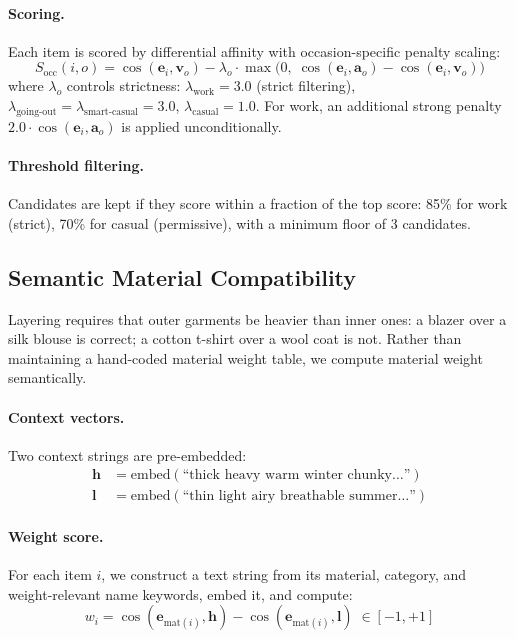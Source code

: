 \documentclass[10pt,twocolumn]{article}
\begin{document}
\paragraph{Scoring.}
Each item is scored by differential affinity with occasion-specific penalty
scaling:
\begin{equation}
  S_{\text{occ}}(i, o) = \cos(\mathbf{e}_i, \mathbf{v}_o) -
    \lambda_o \cdot \max\!\big(0,\;
    \cos(\mathbf{e}_i, \mathbf{a}_o) - \cos(\mathbf{e}_i, \mathbf{v}_o)\big)
\label{eq:occasion}
\end{equation}
where $\lambda_o$ controls strictness: $\lambda_{\text{work}} = 3.0$ (strict
filtering), $\lambda_{\text{going-out}} = \lambda_{\text{smart-casual}} =
3.0$, $\lambda_{\text{casual}} = 1.0$.  For work, an additional strong
penalty $2.0 \cdot \cos(\mathbf{e}_i, \mathbf{a}_o)$ is applied
unconditionally.

\paragraph{Threshold filtering.}
Candidates are kept if they score within a fraction of the top score:
85\% for work (strict), 70\% for casual (permissive), with a minimum floor
of 3 candidates.

\subsection{Semantic Material Compatibility}
\label{sec:material}

Layering requires that outer garments be heavier than inner ones: a blazer
over a silk blouse is correct; a cotton t-shirt over a wool coat is not.
Rather than maintaining a hand-coded material weight table, we compute
material weight semantically.

\paragraph{Context vectors.}
Two context strings are pre-embedded:
\begin{align}
  \mathbf{h} &= \text{embed}(\text{``thick heavy warm winter chunky\ldots''}) \\
  \mathbf{l} &= \text{embed}(\text{``thin light airy breathable summer\ldots''})
\end{align}

\paragraph{Weight score.}
For each item $i$, we construct a text string from its material, category,
and weight-relevant name keywords, embed it, and compute:
\begin{equation}
  w_i = \cos(\mathbf{e}_{\text{mat}(i)}, \mathbf{h}) -
    \cos(\mathbf{e}_{\text{mat}(i)}, \mathbf{l})
  \;\in [-1, +1]
\label{eq:material_weight}
\end{equation}
\end{document}

